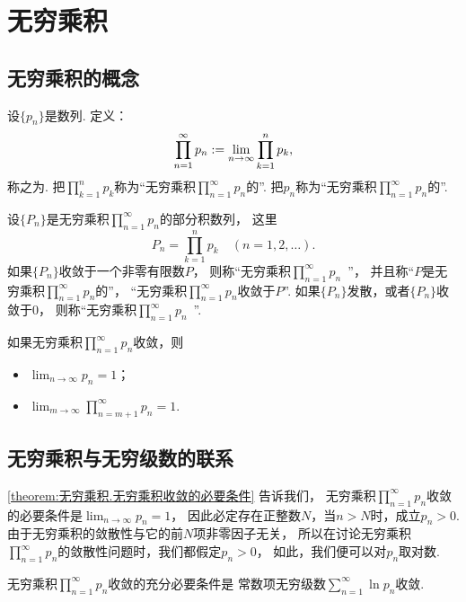 \section{无穷乘积}
\subsection{无穷乘积的概念}
\begin{definition}
设\(\{p_n\}\)是数列.
定义：\[
	\prod_{n=1}^\infty p_n
	:=
	\lim_{n\to\infty} \prod_{k=1}^n p_k,
\]
称之为.
把\(\prod_{k=1}^n p_k\)称为“无穷乘积\(\prod_{n=1}^\infty p_n\)的”.
把\(p_n\)称为“无穷乘积\(\prod_{n=1}^\infty p_n\)的”.

设\(\{P_n\}\)是无穷乘积\(\prod_{n=1}^\infty p_n\)的部分积数列，
这里\[
	P_n = \prod_{k=1}^n p_k
	\quad(n=1,2,\dotsc).
\]
如果\(\{P_n\}\)收敛于一个非零有限数\(P\)，
则称“无穷乘积\(\prod_{n=1}^\infty p_n\)~”，
并且称“\(P\)是无穷乘积\(\prod_{n=1}^\infty p_n\)的”，
“无穷乘积\(\prod_{n=1}^\infty p_n\)收敛于\(P\)”.
如果\(\{P_n\}\)发散，或者\(\{P_n\}\)收敛于\(0\)，
则称“无穷乘积\(\prod_{n=1}^\infty p_n\)~”.
\end{definition}

\begin{theorem}\label{theorem:无穷乘积.无穷乘积收敛的必要条件}
如果无穷乘积\(\prod_{n=1}^\infty p_n\)收敛，则\begin{itemize}
	\item \(\lim_{n\to\infty} p_n = 1\)；
	\item \(\lim_{m\to\infty} \prod_{n=m+1}^\infty p_n = 1\).
\end{itemize}
\end{theorem}

\subsection{无穷乘积与无穷级数的联系}
\cref{theorem:无穷乘积.无穷乘积收敛的必要条件} 告诉我们，
无穷乘积\(\prod_{n=1}^\infty p_n\)收敛的必要条件是\(\lim_{n\to\infty} p_n = 1\)，
因此必定存在正整数\(N\)，当\(n>N\)时，成立\(p_n>0\).
由于无穷乘积的敛散性与它的前\(N\)项非零因子无关，
所以在讨论无穷乘积\(\prod_{n=1}^\infty p_n\)的敛散性问题时，我们都假定\(p_n>0\)，
如此，我们便可以对\(p_n\)取对数.
\begin{theorem}\label{theorem:无穷乘积.无穷乘积收敛性与无穷级数收敛性的联系}
无穷乘积\(\prod_{n=1}^\infty p_n\)收敛的充分必要条件是
常数项无穷级数\(\sum_{n=1}^\infty \ln p_n\)收敛.
\end{theorem}

